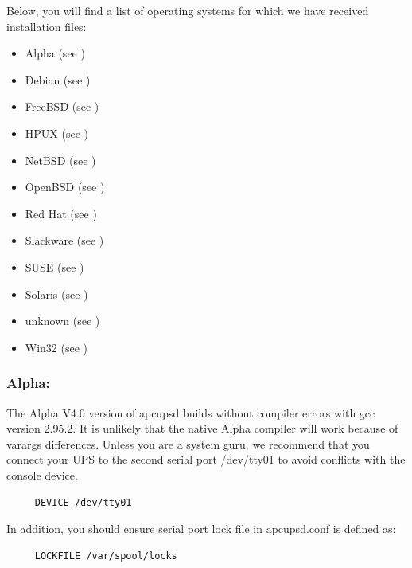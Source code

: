 Below, you will find a list of operating systems for which we have received
installation files:  

\begin{itemize}
\item Alpha (see 
   )  
\item Debian (see 
   )  
\item FreeBSD (see 
   )  
\item HPUX (see 
   )  
\item NetBSD (see 
   )  
\item OpenBSD (see 
   )  
\item Red Hat (see 
   )  
\item Slackware (see 
   )  
\item SUSE (see 
   )  
\item Solaris (see 
   )  
\item unknown (see 
   )  
\item Win32 (see 
   ) 
\end{itemize}

\label{Alpha}

\subsubsection*{Alpha:}

\label{index-Alpha-32}
\label{index-OS_002c-Alpha-33}
The Alpha V4.0 version of apcupsd builds without compiler errors with gcc
version 2.95.2. It is unlikely that the native Alpha compiler will work
because of varargs differences. Unless you are a system guru, we recommend
that you connect your UPS to the second serial port /dev/tty01 to avoid
conflicts with the console device. 

\footnotesize
\begin{verbatim}
     DEVICE /dev/tty01
\end{verbatim}
\normalsize

In addition, you should ensure serial port lock file in apcupsd.conf is
defined as: 

\footnotesize
\begin{verbatim}
     LOCKFILE /var/spool/locks
\end{verbatim}
\normalsize

